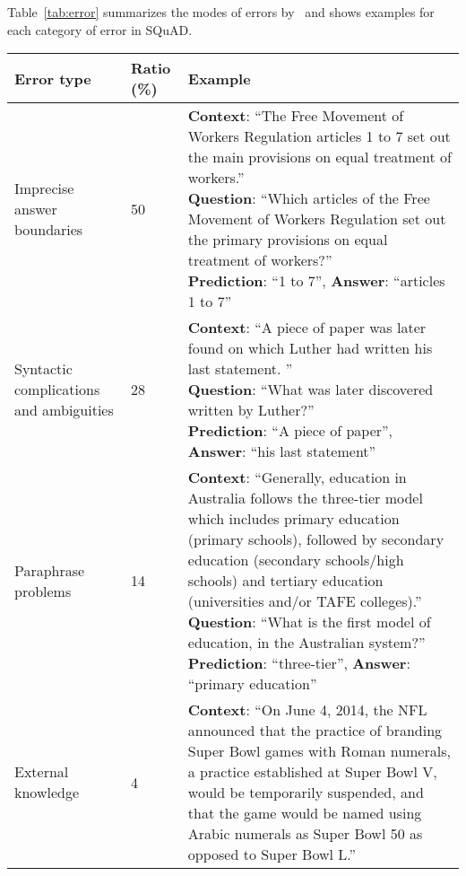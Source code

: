 Table~\ref{tab:error} summarizes the modes of errors by \sysshort\  and shows examples for each category of error in SQuAD. 
\begin{table}[!htb]
    \centering
    \begin{tabular}{L{2cm} C{1.5cm} L{9.5cm}}
        Error type & Ratio (\%) & Example\\
        \hline
        \hline
        Imprecise answer boundaries & 50 & \parbox[t]{9cm}{\textbf{Context}: ``The Free Movement of Workers Regulation articles 1 to 7 set out the main provisions on equal treatment of workers.''\\
        \textbf{Question}: ``Which articles of the Free Movement of Workers Regulation set out the primary provisions on equal treatment of workers?''\\
        \textbf{Prediction}: ``1 to 7'',
        \textbf{Answer}: ``articles 1 to 7'' \\}\\
        \hline
        Syntactic complications and ambiguities & 28 & \parbox[t]{9cm}{\textbf{Context}: ``A piece of paper was later found on which Luther had written his last statement. ''\\
        \textbf{Question}: ``What was later discovered written by Luther?''\\
        \textbf{Prediction}: ``A piece of paper'',
        \textbf{Answer}: ``his last statement'' \\}\\
        \hline
        Paraphrase problems & 14 & \parbox[t]{9cm}{\textbf{Context}: ``Generally, education in Australia follows the three-tier model which includes primary education (primary schools), followed by secondary education (secondary schools/high schools) and tertiary education (universities and/or TAFE colleges).''\\
        \textbf{Question}: ``What is the first model of education, in the Australian system?''\\
        \textbf{Prediction}: ``three-tier'',
        \textbf{Answer}: ``primary education'' \\}\\
        \hline
        External knowledge & 4 & \parbox[t]{9cm}{\textbf{Context}: ``On June 4, 2014, the NFL announced that the practice of branding Super Bowl games with Roman numerals, a practice established at Super Bowl V, would be temporarily suspended, and that the game would be named using Arabic numerals as Super Bowl 50 as opposed to Super Bowl L.''\\
}
\end{tabular}
\end{table}
